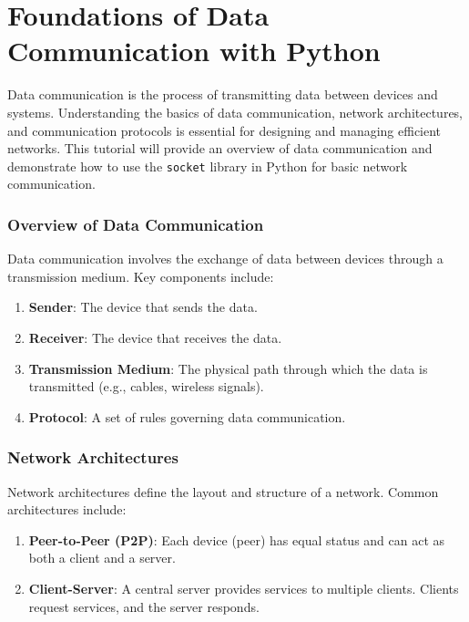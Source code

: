 \documentclass[
  letterpaper,
  DIV=11,
  numbers=noendperiod]{scrreprt}
\providecommand{\tightlist}{%
  \setlength{\itemsep}{0pt}\setlength{\parskip}{0pt}}\usepackage{longtable,booktabs,array}
\begin{document}

\chapter{Foundations of Data Communication with
Python}\label{foundations-of-data-communication-with-python}

Data communication is the process of transmitting data between devices
and systems. Understanding the basics of data communication, network
architectures, and communication protocols is essential for designing
and managing efficient networks. This tutorial will provide an overview
of data communication and demonstrate how to use the \texttt{socket}
library in Python for basic network communication.

\subsection{Overview of Data
Communication}\label{overview-of-data-communication}

Data communication involves the exchange of data between devices through
a transmission medium. Key components include:

\begin{enumerate}
\def\labelenumi{\arabic{enumi}.}
\tightlist
\item
  \textbf{Sender}: The device that sends the data.
\item
  \textbf{Receiver}: The device that receives the data.
\item
  \textbf{Transmission Medium}: The physical path through which the data
  is transmitted (e.g., cables, wireless signals).
\item
  \textbf{Protocol}: A set of rules governing data communication.
\end{enumerate}

\subsection{Network Architectures}\label{network-architectures}

Network architectures define the layout and structure of a network.
Common architectures include:

\begin{enumerate}
\def\labelenumi{\arabic{enumi}.}
\tightlist
\item
  \textbf{Peer-to-Peer (P2P)}: Each device (peer) has equal status and
  can act as both a client and a server.
\item
  \textbf{Client-Server}: A central server provides services to multiple
  clients. Clients request services, and the server responds.
\end{enumerate}
\end{document}
